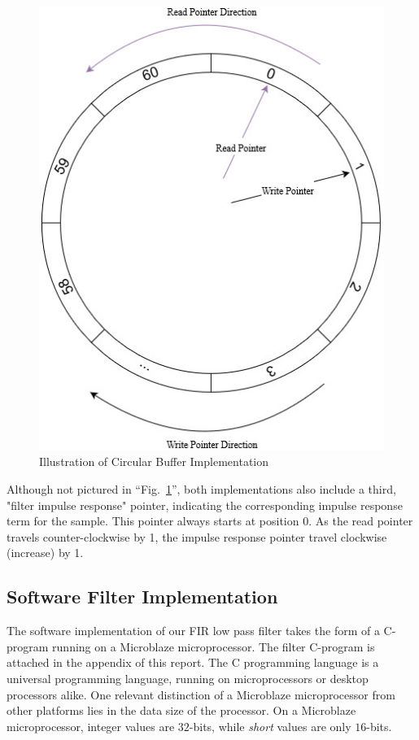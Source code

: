\documentclass[conference]{IEEEtran}
\begin{document}
\begin{figure}[!h]
    \centerline{\includegraphics[width=0.85\linewidth]{Figures/Filter/circular_buffer.jpg}}
    \caption{Illustration of Circular Buffer Implementation}
    \label{circ_buff}
\end{figure}

Although not pictured in ``Fig.~\ref{circ_buff}'', both implementations also include a third, "filter impulse response" pointer, indicating the corresponding impulse response term for the sample. This pointer always starts at position 0. As the read pointer travels counter-clockwise by 1, the impulse response pointer travel clockwise (increase) by 1.

\subsection{Software Filter Implementation} \label{software_imp}
The software implementation of our FIR low pass filter takes the form of a C-program running on a Microblaze\textregistered{} microprocessor. The filter C-program is attached in the appendix of this report. The C programming language is a universal programming language, running on microprocessors or desktop processors alike. One relevant distinction of a Microblaze\textregistered{} microprocessor from other platforms lies in the data size of the processor. On a Microblaze\textregistered{} microprocessor, integer values are $32$-bits, while \textit{short} values are only $16$-bits. 
\end{document}

